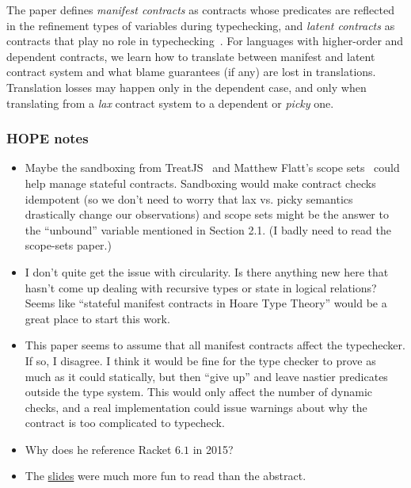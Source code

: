 \documentclass{article}
\begin{document}

The paper defines \emph{manifest contracts} as contracts whose predicates are reflected in the refinement types of variables during typechecking,
 and \emph{latent contracts} as contracts that play no role in typechecking~\cite{gpw-contracts}.
For languages with higher-order and dependent contracts, we learn how to translate between manifest and latent contract system and what blame guarantees (if any) are lost in translations.
Translation losses may happen only in the dependent case, and only when translating from a \emph{lax} contract system to a dependent or \emph{picky} one.



\subsubsection*{HOPE notes~\cite{g-combining}}
\begin{itemize}
\item
  Maybe the sandboxing from TreatJS~\cite{kt-treat} and Matthew Flatt's scope sets~\cite{f-bindings} could help manage stateful contracts.
  Sandboxing would make contract checks idempotent (so we don't need to worry that lax vs. picky semantics drastically change our observations) and scope sets might be the answer to the ``unbound'' variable mentioned in Section 2.1.
  (I badly need to read the scope-sets paper.)
\item
  I don't quite get the issue with circularity.
  Is there anything new here that hasn't come up dealing with recursive types or state in logical relations?
  Seems like ``stateful manifest contracts in Hoare Type Theory'' would be a great place to start this work.
\item
  This paper seems to assume that all manifest contracts affect the typechecker.
  If so, I disagree.
  I think it would be fine for the type checker to prove as much as it could statically, but then ``give up'' and leave nastier predicates outside the type system.
  This would only affect the number of dynamic checks, and a real implementation could issue warnings about why the contract is too complicated to typecheck.
\item
  Why does he reference Racket $6.1$ in 2015?
\item
  The \href{http://www.cs.pomona.edu/~michael/papers/hope2015_presentation.pdf}{slides} were much more fun to read than the abstract.
\end{itemize}


\footnotesize


\end{document}
